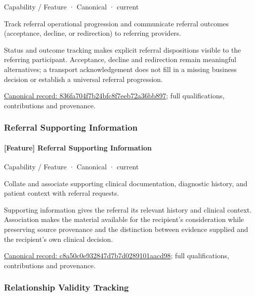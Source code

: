 \label{element:836fa704f7b24bfc8f7eeb72a36bb897}
{\small Capability / Feature · Canonical · current}\par

Track referral operational progression and communicate referral outcomes (acceptance, decline, or redirection) to referring providers.



Status and outcome tracking makes explicit referral dispositions visible to the referring participant. Acceptance, decline and redirection remain meaningful alternatives; a transport acknowledgement does not fill in a missing business decision or establish a universal referral progression.


{\footnotesize \href{../../../../continuum/strategy/capability/feature/836fa704f7b24bfc8f7eeb72a36bb897.md}{Canonical record: 836fa704f7b24bfc8f7eeb72a36bb897}; full qualifications, contributions and provenance.}\par
\subsubsection{Referral Supporting Information}

\paragraph{[Feature] Referral Supporting Information}

\label{element:c8a50c0e932847d7b7d0289101aacd98}
{\small Capability / Feature · Canonical · current}\par

Collate and associate supporting clinical documentation, diagnostic history, and patient context with referral requests.



Supporting information gives the referral its relevant history and clinical context. Association makes the material available for the recipient's consideration while preserving source provenance and the distinction between evidence supplied and the recipient's own clinical decision.


{\footnotesize \href{../../../../continuum/strategy/capability/feature/c8a50c0e932847d7b7d0289101aacd98.md}{Canonical record: c8a50c0e932847d7b7d0289101aacd98}; full qualifications, contributions and provenance.}\par
\subsubsection{Relationship Validity Tracking}

